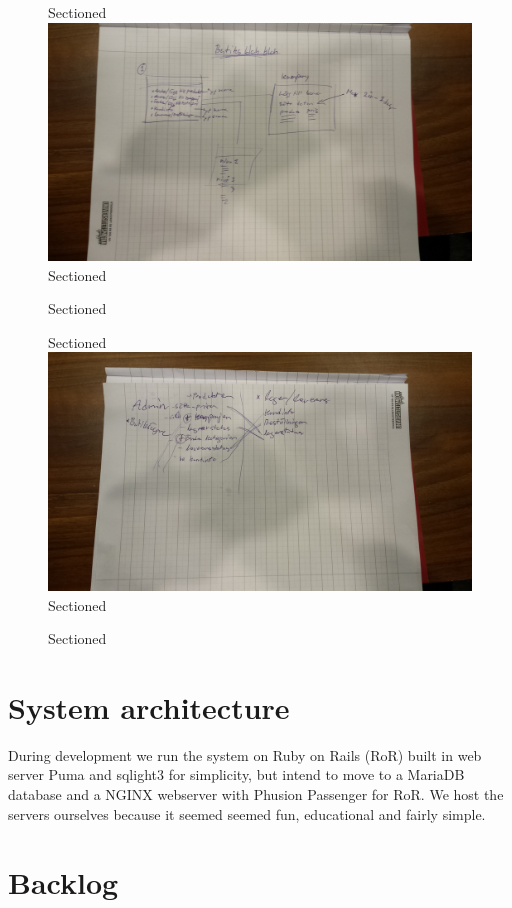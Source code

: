 \documentclass[paper=a4, fontsize=11pt]{report} %
\begin{document}
\begin{itemize}
	\begin{figure}
		Sectioned\includegraphics[scale=0.12]{artifacts/ButiksAdmin.jpeg}
		Sectioned\caption{}
		Sectioned\label{fig:3}
	\end{figure}

	\begin{figure}
		Sectioned\includegraphics[scale=0.12]{artifacts/Admin.jpeg}
		Sectioned\caption{}
		Sectioned\label{fig:4}
	\end{figure}

\section*{System architecture}
	During development we run the system on Ruby on Rails (RoR) built in web server
	Puma and sqlight3 for simplicity, but intend to move to a MariaDB database
	and a NGINX webserver with Phusion Passenger for RoR. We host
	the servers ourselves because it seemed seemed fun, educational and fairly simple.

\section*{Backlog}


\end{itemize}
\end{document}
